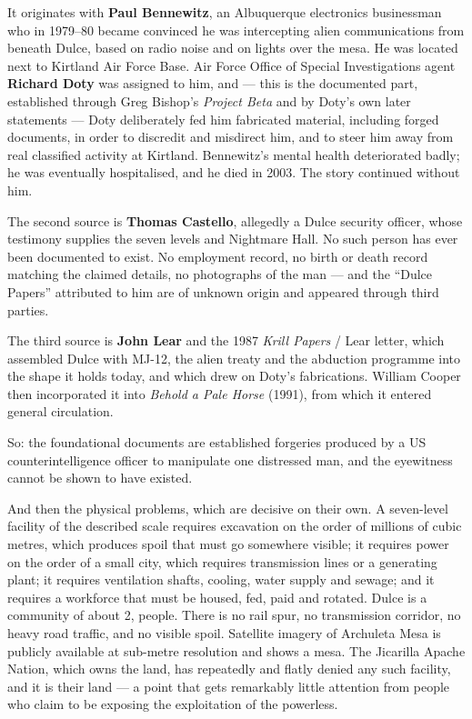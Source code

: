 It originates with \textbf{Paul Bennewitz}, an Albuquerque electronics businessman who in 1979--80
became convinced he was intercepting alien communications from beneath Dulce, based on radio noise
and on lights over the mesa. He was located next to Kirtland Air Force Base. Air Force Office of
Special Investigations agent \textbf{Richard Doty} was assigned to him, and --- this is the
documented part, established through Greg Bishop's \emph{Project Beta} and by Doty's own later
statements --- Doty deliberately fed him fabricated material, including forged documents, in order
to discredit and misdirect him, and to steer him away from real classified activity at Kirtland.
Bennewitz's mental health deteriorated badly; he was eventually hospitalised, and he died in 2003.
The story continued without him.

The second source is \textbf{Thomas Castello}, allegedly a Dulce security officer, whose testimony
supplies the seven levels and Nightmare Hall. No such person has ever been documented to exist. No
employment record, no birth or death record matching the claimed details, no photographs of the man
--- and the ``Dulce Papers'' attributed to him are of unknown origin and appeared through third
parties.

The third source is \textbf{John Lear} and the 1987 \emph{Krill Papers} / Lear letter, which
assembled Dulce with MJ-12, the alien treaty and the abduction programme into the shape it holds
today, and which drew on Doty's fabrications. William Cooper then incorporated it into
\emph{Behold a Pale Horse} (1991), from which it entered general circulation.

So: the foundational documents are established forgeries produced by a US counterintelligence
officer to manipulate one distressed man, and the eyewitness cannot be shown to have existed.

And then the physical problems, which are decisive on their own. A seven-level facility of the
described scale requires excavation on the order of millions of cubic metres, which produces spoil
that must go somewhere visible; it requires power on the order of a small city, which requires
transmission lines or a generating plant; it requires ventilation shafts, cooling, water supply and
sewage; and it requires a workforce that must be housed, fed, paid and rotated. Dulce is a
community of about 2, people. There is no rail spur, no transmission corridor, no heavy road
traffic, and no visible spoil. Satellite imagery of Archuleta Mesa is publicly available at
sub-metre resolution and shows a mesa. The Jicarilla Apache Nation, which owns the land, has
repeatedly and flatly denied any such facility, and it is their land --- a point that gets
remarkably little attention from people who claim to be exposing the exploitation of the powerless.

